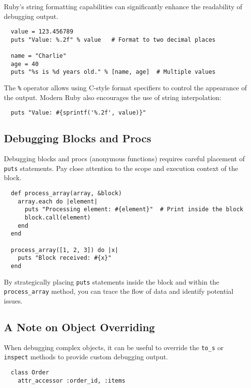 \documentclass{article}
\begin{document}
{{{{Ruby's string formatting capabilities can significantly enhance the readability of debugging output.

\begin{verbatim}
  value = 123.456789
  puts "Value: %.2f" % value   # Format to two decimal places

  name = "Charlie"
  age = 40
  puts "%s is %d years old." % [name, age]  # Multiple values
\end{verbatim}

The \texttt{\%} operator allows using C-style format specifiers to control the appearance of the output.  Modern Ruby also encourages the use of string interpolation:

\begin{verbatim}
  puts "Value: #{sprintf('%.2f', value)}"
\end{verbatim}

\subsection*{Debugging Blocks and Procs}

Debugging blocks and procs (anonymous functions) requires careful placement of \texttt{puts} statements.  Pay close attention to the scope and execution context of the block.

\begin{verbatim}
  def process_array(array, &block)
    array.each do |element|
      puts "Processing element: #{element}"  # Print inside the block
      block.call(element)
    end
  end

  process_array([1, 2, 3]) do |x|
    puts "Block received: #{x}"
  end
\end{verbatim}

By strategically placing \texttt{puts} statements inside the block and within the \texttt{process\_array} method, you can trace the flow of data and identify potential issues.

\subsection*{A Note on Object Overriding}

When debugging complex objects, it can be useful to override the \texttt{to\_s} or \texttt{inspect} methods to provide custom debugging output.

\begin{verbatim}
  class Order
    attr_accessor :order_id, :items


\end{verbatim}}}}}
\end{document}
